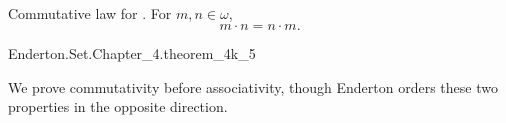 \documentclass{report}
\begin{document}
\subsection{}

  \begin{theorem}[4K-5]
    Commutative law for .
    For $m, n \in \omega$, $$m \cdot n = n \cdot m.$$
  \end{theorem}

    {Enderton.Set.Chapter\_4.theorem\_4k\_5}


  \begin{note}
    We prove commutativity before associativity, though Enderton orders these
    two properties in the opposite direction.
  \end{note}
\end{document}
